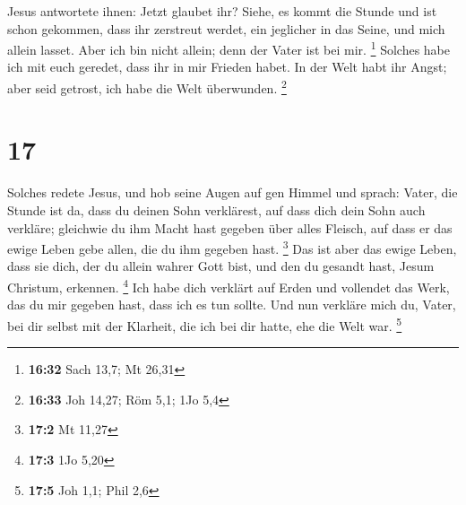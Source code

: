  Jesus antwortete ihnen: Jetzt glaubet ihr?
 Siehe, es kommt die Stunde und ist schon gekommen, dass
ihr zerstreut werdet, ein jeglicher in das Seine, und mich allein
lasset. Aber ich bin nicht allein; denn der Vater ist bei mir.
\footnote{\textbf{16:32} Sach 13,7; Mt 26,31}  Solches
habe ich mit euch geredet, dass ihr in mir Frieden habet. In der Welt
habt ihr Angst; aber seid getrost, ich habe die Welt überwunden.
\footnote{\textbf{16:33} Joh 14,27; Röm 5,1; 1Jo 5,4}

\hypertarget{section-7}{%
\section{17}\label{section-7}}

 Solches redete Jesus, und hob seine Augen auf gen Himmel
und sprach: Vater, die Stunde ist da, dass du deinen Sohn verklärest,
auf dass dich dein Sohn auch verkläre;  gleichwie du ihm
Macht hast gegeben über alles Fleisch, auf dass er das ewige Leben gebe
allen, die du ihm gegeben hast. \footnote{\textbf{17:2} Mt 11,27}
 Das ist aber das ewige Leben, dass sie dich, der du
allein wahrer Gott bist, und den du gesandt hast, Jesum Christum,
erkennen. \footnote{\textbf{17:3} 1Jo 5,20}  Ich habe dich
verklärt auf Erden und vollendet das Werk, das du mir gegeben hast, dass
ich es tun sollte.  Und nun verkläre mich du, Vater, bei
dir selbst mit der Klarheit, die ich bei dir hatte, ehe die Welt war.
\footnote{\textbf{17:5} Joh 1,1; Phil 2,6}

